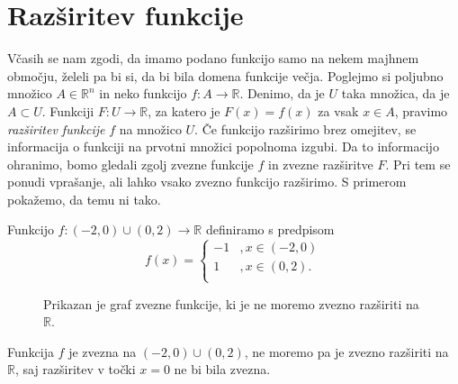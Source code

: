 \documentclass[mat1]{fmfdelo}
\newcommand{\R}{\mathbb R}
\newcommand{\0}{\underline{0}}
\begin{document}
\section{Razširitev funkcije}\label{raz:siritev}
Včasih se nam zgodi, da imamo podano funkcijo samo na nekem majhnem območju, želeli pa bi si, da bi bila domena funkcije večja. Poglejmo si poljubno množico $A \in \R^n$ in neko funkcijo $f : A \to \R$. Denimo, da je $U$ taka množica, da je $A \subset U$. Funkciji $F : U \to \R$, za katero je $F(x) = f(x)$ za vsak $x \in A$, pravimo \emph{razširitev funkcije} $f$ na množico $U$. Če funkcijo razširimo brez omejitev, se informacija o funkciji na prvotni množici popolnoma izgubi. Da to informacijo ohranimo, bomo gledali zgolj zvezne funkcije $f$ in zvezne razširitve $F$. Pri tem se ponudi vprašanje, ali lahko vsako zvezno funkcijo razširimo. S primerom pokažemo, da temu ni tako.

\begin{primer}
Funkcijo $f : (-2, 0) \cup (0, 2) \to \R$ definiramo s predpisom
\[  f(x) = \left \{
\begin{array}{ll}
	-1 &, x \in (-2, 0)\\
	1 &, x \in (0, 2). \\
\end{array} 
\right. \]

\begin{figure}[h!]
	\centering
	\caption{Prikazan je graf zvezne funkcije, ki je ne moremo zvezno razširiti na $\R$.}
\end{figure}

Funkcija $f$ je zvezna na $(-2, 0) \cup (0, 2)$, ne moremo pa je zvezno razširiti na $\R$, saj razširitev v točki $x = 0$ ne bi bila zvezna.
\end{primer}
\end{document}
